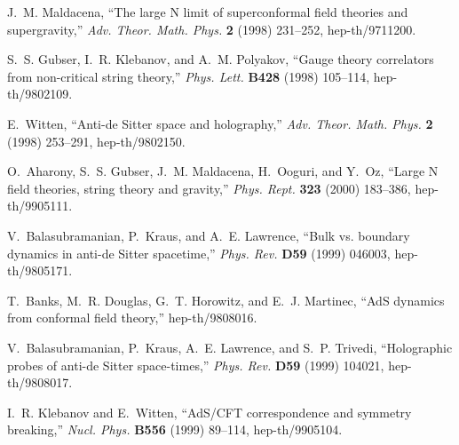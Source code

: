 \documentclass[12pt]{article}
\begin{document}
\providecommand{\href}[2]{#2}
\begingroup\raggedright
\begin{thebibliography}{10}

J.~M. Maldacena, ``The large N limit of superconformal field theories and
  supergravity,'' {\em Adv. Theor. Math. Phys.} {\bf 2} (1998) 231--252,
\href{http://www.arXiv.org/abs/hep-th/9711200}{ hep-th/9711200}.

S.~S. Gubser, I.~R. Klebanov, and A.~M. Polyakov, ``Gauge theory correlators
  from non-critical string theory,'' {\em Phys. Lett.} {\bf B428} (1998)
  105--114,
\href{http://www.arXiv.org/abs/hep-th/9802109}{ hep-th/9802109}.

E.~Witten, ``Anti-de Sitter space and holography,'' {\em Adv. Theor. Math.
  Phys.} {\bf 2} (1998) 253--291,
\href{http://www.arXiv.org/abs/hep-th/9802150}{ hep-th/9802150}.

O.~Aharony, S.~S. Gubser, J.~M. Maldacena, H.~Ooguri, and Y.~Oz, ``Large N
  field theories, string theory and gravity,'' {\em Phys. Rept.} {\bf 323}
  (2000) 183--386,
\href{http://www.arXiv.org/abs/hep-th/9905111}{ hep-th/9905111}.

V.~Balasubramanian, P.~Kraus, and A.~E. Lawrence, ``Bulk vs. boundary dynamics
  in anti-de Sitter spacetime,'' {\em Phys. Rev.} {\bf D59} (1999) 046003,
\href{http://www.arXiv.org/abs/hep-th/9805171}{ hep-th/9805171}.

T.~Banks, M.~R. Douglas, G.~T. Horowitz, and E.~J. Martinec, ``AdS dynamics
  from conformal field theory,''
\href{http://www.arXiv.org/abs/hep-th/9808016}{ hep-th/9808016}.

V.~Balasubramanian, P.~Kraus, A.~E. Lawrence, and S.~P. Trivedi, ``Holographic
  probes of anti-de Sitter space-times,'' {\em Phys. Rev.} {\bf D59} (1999)
  104021,
\href{http://www.arXiv.org/abs/hep-th/9808017}{ hep-th/9808017}.

I.~R. Klebanov and E.~Witten, ``AdS/CFT correspondence and symmetry breaking,''
  {\em Nucl. Phys.} {\bf B556} (1999) 89--114,
\href{http://www.arXiv.org/abs/hep-th/9905104}{ hep-th/9905104}.


\end{thebibliography}
\end{document}
